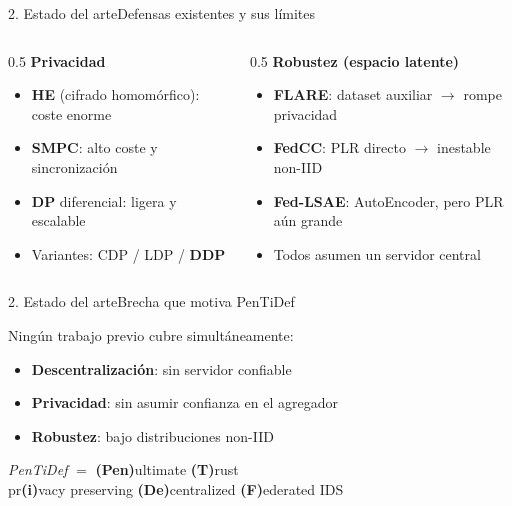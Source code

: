 \begin{frame}{2. Estado del arte}{Defensas existentes y sus límites}
  \begin{columns}[T]
    \begin{column}{0.5\textwidth}
      \textbf{Privacidad}\\[0.2em]
      \begin{itemize}\small
        \item \textbf{HE} (cifrado homomórfico): \textcolor{red!70!black}{coste enorme}
        \item \textbf{SMPC}: alto coste y sincronización
        \item \textbf{DP} diferencial: ligera y escalable
        \item Variantes: CDP / LDP / \textcolor{UMUblue}{\textbf{DDP}}
      \end{itemize}
    \end{column}
    \begin{column}{0.5\textwidth}
      \textbf{Robustez (espacio latente)}\\[0.2em]
      \begin{itemize}\small
        \item \textbf{FLARE}: dataset auxiliar $\rightarrow$ \textcolor{red!70!black}{rompe privacidad}
        \item \textbf{FedCC}: PLR directo $\rightarrow$ \textcolor{red!70!black}{inestable non-IID}
        \item \textbf{Fed-LSAE}: AutoEncoder, pero PLR aún grande
        \item Todos asumen un \textcolor{red!70!black}{servidor central}
      \end{itemize}
    \end{column}
  \end{columns}
\end{frame}

\begin{frame}{2. Estado del arte}{Brecha que motiva PenTiDef}
  \begin{block}{Ningún trabajo previo cubre simultáneamente:}
    \begin{itemize}
      \item \textbf{Descentralización}: sin servidor confiable
      \item \textbf{Privacidad}: sin asumir confianza en el agregador
      \item \textbf{Robustez}: bajo distribuciones non-IID
    \end{itemize}
  \end{block}
  \vfill
  \begin{center}
    \textit{PenTiDef} $=$ \textbf{(Pen)}ultimate \textbf{(T)}rust \\
    pr\textbf{(i)}vacy preserving \textbf{(De)}centralized \textbf{(F)}ederated IDS
  \end{center}
\end{frame}